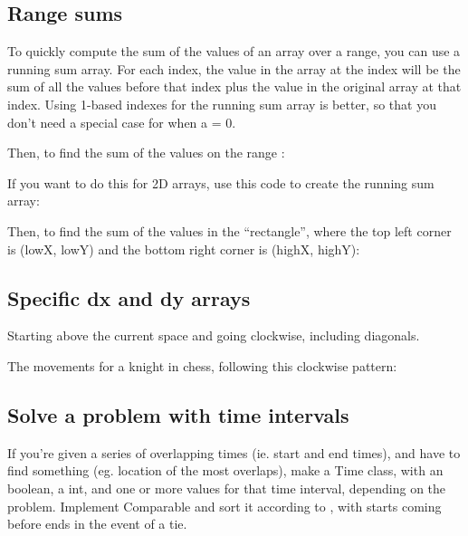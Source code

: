 \subsection*{Range sums}

To quickly compute the sum of the values of an array over a range, you can use a running sum array. For each index, the value in the array at the index will be the sum of all the values before that index plus the value in the original array at that index. Using 1-based indexes for the running sum array is better, so that you don’t need a special case for when a = 0.



Then, to find the sum of the values on the range \inline{[a, b]}:



If you want to do this for 2D arrays, use this code to create the running sum array:



Then, to find the sum of the values in the “rectangle”, where the top left corner is (lowX, lowY) and the bottom right corner is (highX, highY):



\subsection*{Specific dx and dy arrays}

Starting above the current space and going clockwise, including diagonals.



The movements for a knight in chess, following this clockwise pattern:



\subsection*{Solve a problem with time intervals}

If you’re given a series of overlapping times (ie. start and end times), and have to find something (eg. location of the most overlaps), make a Time class, with an  boolean, a  int, and one or more values for that time interval, depending on the problem. Implement Comparable and sort it according to , with starts coming before ends in the event of a tie.

